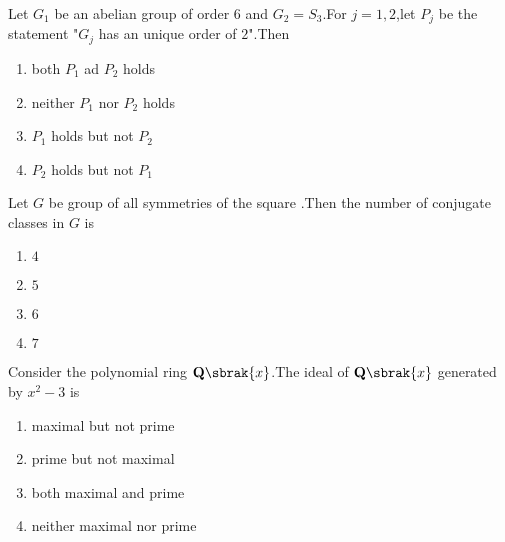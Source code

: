   \item Let $G_1$ be an abelian group of order 6 and $G_2 = S_3$.For $j = 1,2$,let $P_j$ be the statement "$G_j$ has an unique order of $2$".Then
  \begin{enumerate}
      \item both $P_1$ ad $P_2$ holds
      \item neither $P_1$ nor $P_2$ holds 
      \item $P_1$ holds but not $P_2$
      \item $P_2$ holds but not $P_1$
  \end{enumerate}
  \item Let $G$ be group of all symmetries of the square .Then the number of conjugate classes in $G$ is 
  \begin{multicols}{4}
      \begin{enumerate}
          \item $4$
          \item $5$
          \item $6$
          \item $7$
      \end{enumerate}
  \end{multicols}
  \item Consider the polynomial ring $\mathbf{Q}\sbrak{x}$.The ideal of $\mathbf{Q}\sbrak{x}$ generated by $x^2 -3 $ is
  \begin{enumerate}
      \item maximal but not prime
      \item prime but not maximal
      \item both maximal and prime
      \item neither maximal nor prime
  \end{enumerate}

